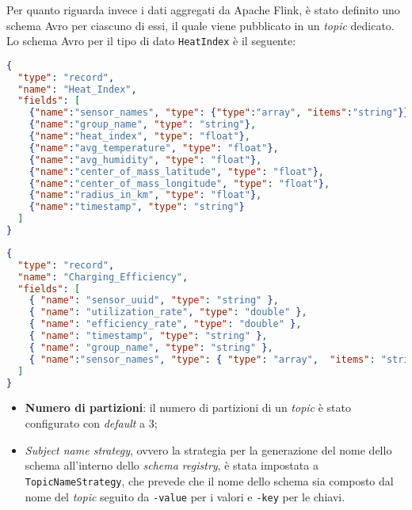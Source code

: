 Per quanto riguarda invece i dati aggregati da Apache Flink, è stato definito uno schema Avro per ciascuno di essi, il quale viene pubblicato in un \textit{topic} dedicato.
Lo schema Avro per il tipo di dato \texttt{HeatIndex} è il seguente:
\begin{lstlisting}[language=json, caption=Schema Avro per il tipo di dato \texttt{HeatIndex},captionpos=b]
{
  "type": "record",
  "name": "Heat_Index",
  "fields": [
    {"name":"sensor_names", "type": {"type":"array", "items":"string"}},
    {"name":"group_name", "type": "string"},
    {"name":"heat_index", "type": "float"},
    {"name":"avg_temperature", "type": "float"},
    {"name":"avg_humidity", "type": "float"},
    {"name":"center_of_mass_latitude", "type": "float"},
    {"name":"center_of_mass_longitude", "type": "float"},
    {"name":"radius_in_km", "type": "float"},
    {"name":"timestamp", "type": "string"}
  ]
}

\end{lstlisting}

\begin{lstlisting}[language=json, caption=Schema Avro per il tipo di dato \texttt{ChargingEfficiency},captionpos=b]
{
  "type": "record",
  "name": "Charging_Efficiency",
  "fields": [
    { "name": "sensor_uuid", "type": "string" },
    { "name": "utilization_rate", "type": "double" },
    { "name": "efficiency_rate", "type": "double" },
    { "name": "timestamp", "type": "string" },
    { "name": "group_name", "type": "string" },
    { "name":"sensor_names", "type": { "type": "array",  "items": "string" } }
  ]
}

\end{lstlisting}

\begin{itemize}
	\item \textbf{Numero di partizioni}: il numero di partizioni di un \textit{topic} è stato configurato con \textit{default} a 3;
	\item \textit{Subject name strategy}, ovvero la strategia per la generazione del nome dello schema all'interno dello \textit{schema registry}, è stata impostata a \texttt{TopicNameStrategy},
	      che prevede che il nome dello schema sia composto dal nome del \textit{topic} seguito da \texttt{-value} per i valori e \texttt{-key} per le chiavi.
\end{itemize}

